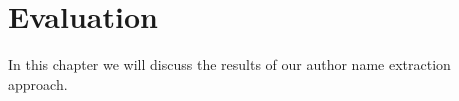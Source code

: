\chapter{Evaluation}\label{cha:evaluation}

In this chapter we will discuss the results of our author name extraction approach.

